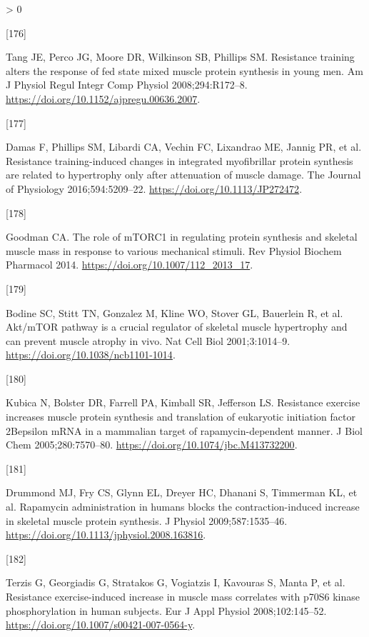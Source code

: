 \documentclass[twoside,10pt]{gihclass} %
\newlength{\cslhangindent}
\newlength{\csllabelwidth}
\newenvironment{CSLReferences}[3] %
 {%
  \setlength{\parindent}{0pt}
  \ifodd #1 \everypar{\setlength{\hangindent}{\cslhangindent}}\ignorespaces\fi
  \ifnum #2 > 0
  \setlength{\parskip}{#2\baselineskip}
  \fi
 }%
 {}
\newcommand{\CSLLeftMargin}[1]{\parbox[t]{\maxof{\widthof{#1}}{\csllabelwidth}}{#1}}
\newcommand{\CSLRightInline}[1]{\parbox[t]{\linewidth}{#1}}
\begin{document}
\begin{CSLReferences}{0}{0}
\leavevmode\hypertarget{ref-RN2723}{}%
\CSLLeftMargin{{[}176{]} }
\CSLRightInline{Tang JE, Perco JG, Moore DR, Wilkinson SB, Phillips SM. Resistance training alters the response of fed state mixed muscle protein synthesis in young men. Am J Physiol Regul Integr Comp Physiol 2008;294:R172--8. \url{https://doi.org/10.1152/ajpregu.00636.2007}.}

\leavevmode\hypertarget{ref-RN2144}{}%
\CSLLeftMargin{{[}177{]} }
\CSLRightInline{Damas F, Phillips SM, Libardi CA, Vechin FC, Lixandrao ME, Jannig PR, et al. Resistance training-induced changes in integrated myofibrillar protein synthesis are related to hypertrophy only after attenuation of muscle damage. The Journal of Physiology 2016;594:5209--22. \url{https://doi.org/10.1113/JP272472}.}

\leavevmode\hypertarget{ref-RN1049}{}%
\CSLLeftMargin{{[}178{]} }
\CSLRightInline{Goodman CA. The role of mTORC1 in regulating protein synthesis and skeletal muscle mass in response to various mechanical stimuli. Rev Physiol Biochem Pharmacol 2014. \url{https://doi.org/10.1007/112_2013_17}.}

\leavevmode\hypertarget{ref-RN782}{}%
\CSLLeftMargin{{[}179{]} }
\CSLRightInline{Bodine SC, Stitt TN, Gonzalez M, Kline WO, Stover GL, Bauerlein R, et al. Akt/mTOR pathway is a crucial regulator of skeletal muscle hypertrophy and can prevent muscle atrophy in vivo. Nat Cell Biol 2001;3:1014--9. \url{https://doi.org/10.1038/ncb1101-1014}.}

\leavevmode\hypertarget{ref-RN860}{}%
\CSLLeftMargin{{[}180{]} }
\CSLRightInline{Kubica N, Bolster DR, Farrell PA, Kimball SR, Jefferson LS. Resistance exercise increases muscle protein synthesis and translation of eukaryotic initiation factor 2Bepsilon mRNA in a mammalian target of rapamycin-dependent manner. J Biol Chem 2005;280:7570--80. \url{https://doi.org/10.1074/jbc.M413732200}.}

\leavevmode\hypertarget{ref-RN780}{}%
\CSLLeftMargin{{[}181{]} }
\CSLRightInline{Drummond MJ, Fry CS, Glynn EL, Dreyer HC, Dhanani S, Timmerman KL, et al. Rapamycin administration in humans blocks the contraction-induced increase in skeletal muscle protein synthesis. J Physiol 2009;587:1535--46. \url{https://doi.org/10.1113/jphysiol.2008.163816}.}

\leavevmode\hypertarget{ref-RN785}{}%
\CSLLeftMargin{{[}182{]} }
\CSLRightInline{Terzis G, Georgiadis G, Stratakos G, Vogiatzis I, Kavouras S, Manta P, et al. Resistance exercise-induced increase in muscle mass correlates with p70S6 kinase phosphorylation in human subjects. Eur J Appl Physiol 2008;102:145--52. \url{https://doi.org/10.1007/s00421-007-0564-y}.}


\end{CSLReferences}
\end{document}
